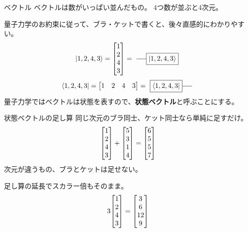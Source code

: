 \documentclass[dvipdfm]{beamer}
\begin{document}
\begin{frame}{ベクトル}
    ベクトルは数がいっぱい並んだもの。
    4つ数が並ぶと4次元。

    量子力学のお約束に従って、ブラ・ケットで書くと、後々直感的にわかりやすい。
    \begin{equation*}
        \ket{1,2,4,3}
        =
        \mqty[1\\2\\4\\3]
        =
        \vcenter{\hbox{
            \begin{tikzpicture}
                \node at(0,0)[draw,rectangle](ket){$\ket{1,2,4,3}$};
                \draw(ket.west)--++(-.5,0);
            \end{tikzpicture}
        }}
    \end{equation*}
    \begin{equation*}
        \bra{1,2,4,3}
        =
        \mqty[1&2&4&3]
        =
        \vcenter{\hbox{
            \begin{tikzpicture}
                \node at(0,0)[draw,rectangle](ket){$\bra{1,2,4,3}$};
                \draw(ket.east)--++(.5,0);
            \end{tikzpicture}
        }}
    \end{equation*}
    量子力学ではベクトルは状態を表すので、\alert{\textbf{状態ベクトル}}と呼ぶことにする。
\end{frame}

\begin{frame}{状態ベクトルの足し算}
    同じ次元のブラ同士、ケット同士なら単純に足すだけ。
    \begin{equation*}
        \mqty[1\\2\\4\\3]
        +
        \mqty[5\\3\\1\\4]
        =
        \mqty[6\\5\\5\\7]
    \end{equation*}
    次元が違うもの、ブラとケットは足せない。

    足し算の延長でスカラー倍もそのまま。
    \begin{equation*}
        3\mqty[1\\2\\4\\3]
        =
        \mqty[3\\6\\12\\9]
    \end{equation*}
\end{frame}
\end{document}
